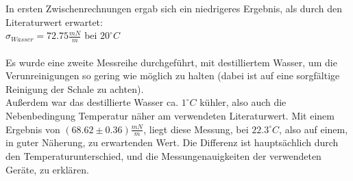 \documentclass[12pt,a4paper]{article}
\begin{document}
\begin{multicols}{2}

In ersten Zwischenrechnungen ergab sich ein niedrigeres Ergebnis, als durch den Literaturwert erwartet:\\
$\sigma_{Wasser} = 72.75 \frac{mN}{m}$ bei $20^{\circ}C$\\
\\
Es wurde eine zweite Messreihe durchgeführt, mit destilliertem Wasser, um die Verunreinigungen so gering wie möglich zu halten (dabei ist auf eine sorgfältige Reinigung der Schale zu achten). \\
Außerdem war das destillierte Wasser ca. $1^{\circ}C$ kühler, also auch die Nebenbedingung Temperatur näher am verwendeten Literaturwert. Mit einem Ergebnis von $(68.62 \pm 0.36) \frac{mN}{m}$,  liegt diese Messung, bei $22.3^{\circ}C$, also auf einem, in guter Näherung, zu erwartenden Wert. Die Differenz ist hauptsächlich durch den Temperaturunterschied, und die Messungenauigkeiten der verwendeten Geräte, zu erklären. 


\end{multicols}
\end{document}
